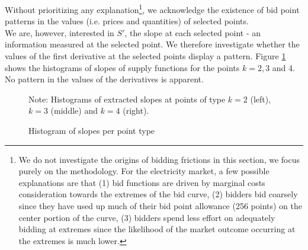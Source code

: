 Without prioritizing any explanation\footnote{We do not investigate the origins of bidding frictions in this section, we focus purely on  the methodology. For the electricity market, a few possible explanations are that (1) bid functions are driven by marginal costs consideration towards the extremes of the bid curve, (2) bidders bid coarsely since they have used up much of their bid point allowance (256 points) on the center portion of the curve, (3) bidders spend less effort on adequately bidding at extremes since the likelihood of the market outcome occurring at the extremes is much lower. }, we acknowledge the existence of bid point patterns in the values (i.e. prices and quantities) of selected points. \\

We are, however, interested in $S'$, the slope at each selected point - an information measured at the selected point. We therefore investigate whether the values of the first derivative at the selected points display a pattern. Figure \ref{histpattern1} shows the histograms of slopes of supply functions for the points $k=2,3$ and 4. No pattern in the values of the derivatives is apparent. \\

\begin{figure}[!ht]
\begin{center}
\caption{Histogram of slopes per point type}
\label{histpattern1}
\end{center}
{ \small Note: Histograms of extracted slopes at points of type $k=2$ (left), $k=3$ (middle) and $k=4$ (right).} 
\end{figure}


